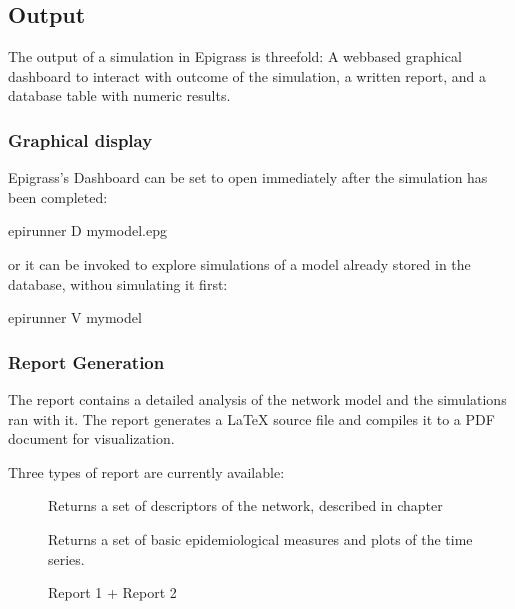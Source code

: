 \documentclass[letterpaper,10pt,english]{sphinxmanual}
\begin{document}
\subsection{Output}
\label{\detokenize{overview:output}}
The output of a simulation in Epigrass is three\sphinxhyphen{}fold: A web\sphinxhyphen{}based graphical dashboard to interact with outcome of the simulation,
a written report, and a database table with numeric results.


\subsubsection{Graphical display}
\label{\detokenize{overview:graphical-display}}
Epigrass’s Dashboard can be set to open immediately after the simulation has been completed:

\begin{sphinxVerbatim}[commandchars=\\\{\}]
\PYGZdl{} epirunner \PYGZhy{}D mymodel.epg
\end{sphinxVerbatim}

or it can be invoked to explore simulations of a model already stored in the database, withou simulating it first:

\begin{sphinxVerbatim}[commandchars=\\\{\}]
\PYGZdl{} epirunner \PYGZhy{}V mymodel
\end{sphinxVerbatim}


\subsubsection{Report Generation}
\label{\detokenize{overview:report-generation}}
The report contains a detailed analysis of the network model and the simulations ran with it. The report generates a
LaTeX source file and compiles it to a PDF document for visualization.

Three types of report are currently available:
\begin{description}
\item[{}] \leavevmode
Returns a set of descriptors of the network, described in chapter

\item[{}] \leavevmode
Returns a set of basic epidemiological measures and plots of the time series.

\item[{}] \leavevmode
Report 1 + Report 2

\end{description}
\end{document}
